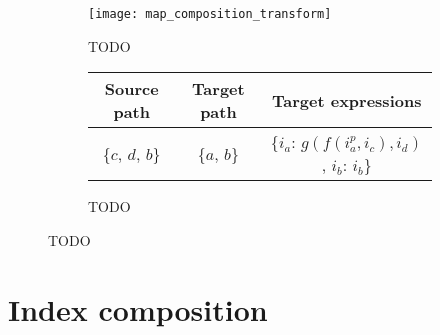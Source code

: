 \documentclass[thesis]{subfiles}
\begin{document}
\begin{figure}[h]
  \centering
  \begin{subfigure}{\textwidth}
    \centering
    \texttt{[image: map\_composition\_transform]}
    \caption{
      TODO
    }
    \label{fig:map_composition_transform}
  \end{subfigure}

  \vspace{1em}

  \begin{subfigure}{\textwidth}
    \centering
    \begin{tabular}{|c|c|c|}
      \hline
      \textbf{Source path} & \textbf{Target path} & \textbf{Target expressions} \\
      \hline
      \{$c$, $d$, $b$\} & \{$a$, $b$\} & \{$i_a$: $g(f(i^p_a, i_c), i_d)$, $i_b$: $i_b$\} \\
      \hline
    \end{tabular}
    \caption{
      TODO
    }
    \label{fig:map_composition_transform_exprs}
  \end{subfigure}

  \caption{TODO}
  \label{fig:map_composition_transform_all}
\end{figure}

\section{Index composition}
\label{sec:index_composition}
\end{document}
